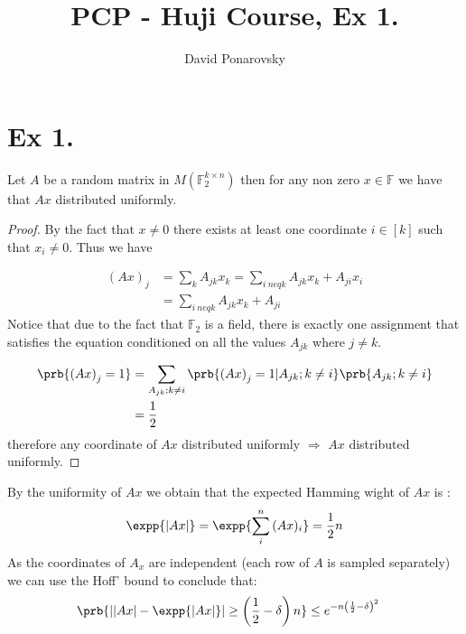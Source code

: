 \documentclass{article}
\title{PCP - Huji Course, Ex 1.}
\author{David Ponarovsky}
\newcommand{\FF}{\mathbb{F}}
\begin{document}
  
  \section{Ex 1.}
  \begin{claim}
    Let $A$ be a random matrix in $M(\mathbb{F}_{2}^{k\times n})$ then for any non zero $x\in \FF$ we have that $Ax$ distributed uniformly.   
  \end{claim}
  \begin{proof}
    By the fact that $x\neq 0$ there exists at least one coordinate $i \in [k]$ such that $x_{i}\neq 0$. Thus we have 

    \begin{equation*}
      \begin{split}    
        \left( Ax \right)_{j} &= \sum_{k}{A_{jk}x_{k}} = \sum_{i \ neq k}{A_{jk}x_{k}}  + A_{ji}x_{i} \\ 
        & =  \sum_{i \ neq k}{A_{jk}x_{k}}  + A_{ji}
      \end{split}
    \end{equation*}
  Notice that due to the fact that $\FF_{2}$ is a field, there is exactly one assignment that satisfies the equation conditioned on all the values $A_{jk}$ where $j\neq k$.    

  \begin{equation*}
    \begin{split}
      \prb{\left( Ax \right)_{j} = 1} &=  \sum_{ A_{jk}; k\neq i   }{\prb{\left( Ax \right)_{j} = 1 | A_{jk} ; k\neq i }\prb{ A_{jk} ; k\neq i }}  \\
      &= \frac{1}{2} 
    \end{split}
  \end{equation*}
  therefore any coordinate of $Ax$ distributed uniformly $\Rightarrow$ $Ax$ distributed uniformly. 
  \end{proof}
By the uniformity of $Ax$ we obtain that the expected Hamming wight of $Ax$ is : 
\begin{equation*}
  \begin{split}
    \expp{|Ax| } = \expp{\sum_{i}^{n}{(Ax)_{i}}} = \frac{1}{2} n    
  \end{split}
\end{equation*} As the coordinates of $A_{x}$ are independent (each row of $A$ is sampled separately) we can use the Hoff' bound to conclude that: 
\begin{equation*}
  \begin{split}
    \prb{| |Ax| - \expp{|Ax|}| \ge \left(\frac{1}{2} - \delta \right) n } & \le e^{-n \left(\frac{1}{2} - \delta \right)^{2} } 
  \end{split}
\end{equation*}
\end{document}
